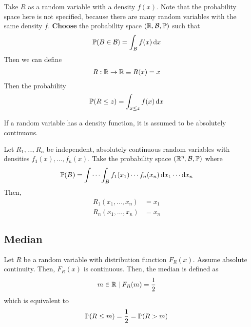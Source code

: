 \noindent Take $R$ as a random variable with a density $f(x)$. Note that the probability space here is not specified, because there are many random variables with the same density $f$. \textbf{Choose} the probability space $(\mathbb{R}, \mathcal{B}, \mathbb{P})$ such that
\begin{align}
    \mathbb{P}(B \in \mathcal{B}) = \int_B f(x) \dd{x}
\end{align}
Then we can define
\begin{align}
    R: \mathbb{R} \to \mathbb{R} \equiv R(x) = x
\end{align}
Then the probability
\begin{align}
    \mathbb{P}(R \le z) = \int_{x \le z} f(x) \dd{x}
\end{align}

\begin{aside}
    If a random variable has a density function, it is assumed to be absolutely continuous.
\end{aside}

Let $R_1, \ldots, R_n$ be independent, absolutely continuous random variables with densities $f_1(x), \ldots, f_n(x)$. Take the probability space $(\mathbb{R}^n, \mathcal{B}, \mathbb{P})$ where
\begin{align}
    \mathbb{P}(B) = \int\cdots\int_B f_1(x_1)\cdots f_n(x_n) \dd{x_1}\cdots\dd{x_n}
\end{align}
Then,
\begin{align}
    R_1(x_1, \ldots, x_n) &= x_1\\
    R_n(x_1, \ldots, x_n) &= x_n
\end{align}

\subsection{Median}
\begin{definition}
    Let $R$ be a random variable with distribution function $F_R(x)$. Assume absolute continuity. Then, $F_R(x)$ is continuous. Then, the median is defined as
    \begin{align}
        m \in \mathbb{R} \mid F_R(m) = \frac{1}{2}
    \end{align}
    which is equivalent to
    \begin{align}
        \mathbb{P}(R \le m) = \frac{1}{2} = \mathbb{P}(R > m)
    \end{align}
\end{definition}

